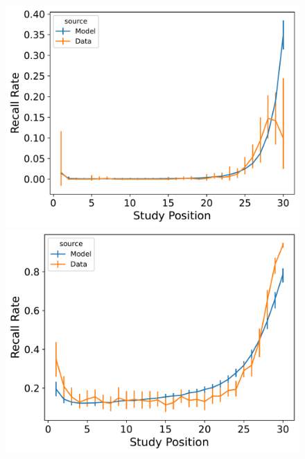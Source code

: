 \documentclass[
  letterpaper,
  11pt,
  english,
  singlespacing,
  headsepline]{MastersDoctoralThesis}
\begin{document}
\begin{figure}
\begin{minipage}{0.33\linewidth}
\includegraphics{icmr_figures/Murdock1962_InstanceCMR_Model_Fitting_LL30_pnr-1.png}\end{minipage}%
%
\begin{minipage}{0.33\linewidth}
\includegraphics{icmr_figures/Murdock1962_InstanceCMR_Model_Fitting_LL30_spc-1.png}\end{minipage}%
\newline
\begin{minipage}{0.33\linewidth}

\end{minipage}
\end{figure}
\end{document}
